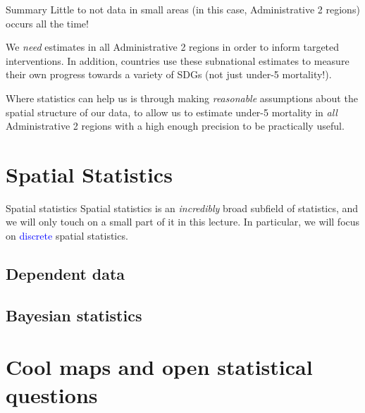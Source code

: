 \documentclass[10pt,t]{beamer}
\begin{document}
\begin{frame}{Summary}
Little to not data in small areas (in this case, Administrative 2 regions) occurs all the time!

\vspace{0.3cm}

We \textit{need} estimates in all Administrative 2 regions in order to inform targeted interventions. In addition, countries use these subnational estimates to measure their own progress towards a variety of SDGs (not just under-5 mortality!).

\vspace{0.3cm}

Where statistics can help us is through making \textit{reasonable} assumptions about the spatial structure of our data, to allow us to estimate under-5 mortality in \textit{all} Administrative 2 regions with a high enough precision to be practically useful.
\end{frame}

\section{Spatial Statistics}

\begin{frame}{Spatial statistics}
Spatial statistics is an \textit{incredibly} broad subfield of statistics, and we will only touch on a small part of it in this lecture. In particular, we will focus on \textcolor{blue}{discrete} spatial statistics.
\end{frame}

\subsection{Dependent data}

\subsection{Bayesian statistics}

\section{Cool maps and open statistical questions}
\end{document}
